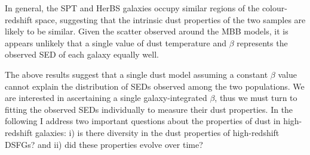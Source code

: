 In general, the SPT and HerBS galaxies occupy similar regions of the colour-redshift space, suggesting that the intrinsic dust properties of the two samples are likely to be similar. Given the scatter observed around the MBB models, it is appears unlikely that a single value of dust temperature and $\beta$ represents the observed SED of each galaxy equally well.  

The above results suggest that a single dust model assuming a constant $\beta$ value cannot explain the distribution of SEDs observed among the two populations. We are interested in ascertaining a single galaxy-integrated $\beta$, thus we must turn to fitting the observed SEDs individually to measure their dust properties. In the following I address two important questions about the properties of dust in high-redshift galaxies: i) is there diversity in the dust properties of high-redshift DSFGs? and ii) did these properties evolve over time? 


